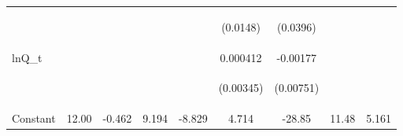 \documentclass[]{article}
\begin{document}
\begin{center}
\begin{tabular}{lcccccccc}
\vspace{4pt} & \begin{footnotesize}\end{footnotesize} & \begin{footnotesize}\end{footnotesize} & \begin{footnotesize}\end{footnotesize} & \begin{footnotesize}\end{footnotesize} & \begin{footnotesize}(0.0148)\end{footnotesize} & \begin{footnotesize}(0.0396)\end{footnotesize} & \begin{footnotesize}\end{footnotesize} & \begin{footnotesize}\end{footnotesize} \\
lnQ\_t &  &  &  &  & 0.000412 & -0.00177 &  &  \\
\vspace{4pt} & \begin{footnotesize}\end{footnotesize} & \begin{footnotesize}\end{footnotesize} & \begin{footnotesize}\end{footnotesize} & \begin{footnotesize}\end{footnotesize} & \begin{footnotesize}(0.00345)\end{footnotesize} & \begin{footnotesize}(0.00751)\end{footnotesize} & \begin{footnotesize}\end{footnotesize} & \begin{footnotesize}\end{footnotesize} \\
Constant & 12.00 & -0.462 & 9.194 & -8.829 & 4.714 & -28.85 & 11.48 & 5.161 \\

\end{tabular}
\end{center}
\end{document}
